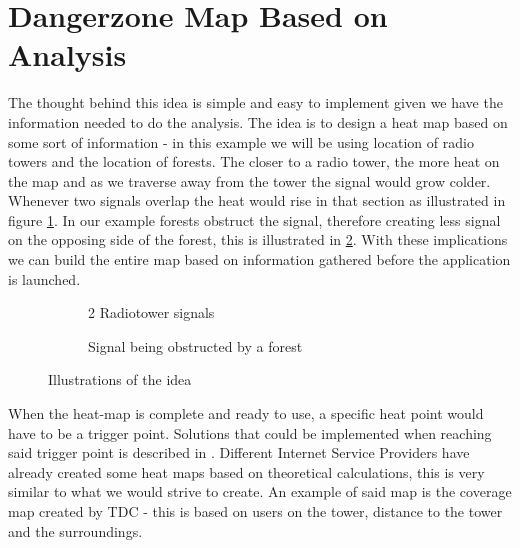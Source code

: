 \section{Dangerzone Map Based on Analysis}
\label{sec:dgrzone}

The thought behind this idea is simple and easy to implement given we have the information needed to do the analysis. The idea is to design a heat map based on some sort of information - in this example we will be using location of radio towers and  the location of forests. The closer to a radio tower, the more heat on the map and as we traverse away from the tower the signal would grow colder. Whenever two signals overlap the heat would rise in that section as illustrated in figure \ref{fig:tempdgr_1}. In our example forests obstruct the signal, therefore creating less signal on the opposing side of the forest, this is illustrated in \ref{fig:tempdgr_2}. With these implications we can build the entire map based on information gathered before the application is launched. 

\begin{figure} [h!]
        \centering
        \begin{subfigure}[b]{0.45\textwidth}
                \caption{2 Radiotower signals}
                \label{fig:tempdgr_1}
        \end{subfigure}
        \begin{subfigure}[b]{0.45\textwidth}
                \caption{Signal being obstructed by a forest}
                \label{fig:tempdgr_2}
        \end{subfigure}
        \caption{Illustrations of the idea}\label{fig:temdgr}
\end{figure}

When the heat-map is complete and ready to use, a specific heat point would have to be a trigger point. Solutions that could be implemented when reaching said trigger point is described in . Different Internet Service Providers have already created some heat maps based on theoretical calculations, this is very similar to what we would strive to create. An example of said map is the coverage map created by TDC - this is based on users on the tower, distance to the tower and the surroundings. 



